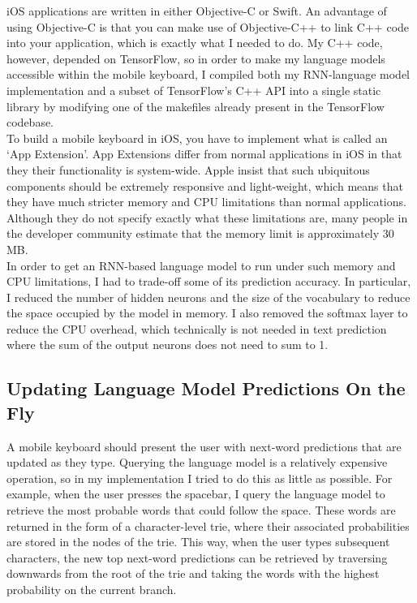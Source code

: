 \documentclass[a4paper, 12pt]{report}
\begin{document}
iOS applications are written in either Objective-C or Swift. An advantage of using Objective-C is that you can make use of Objective-C++ to link C++ code into your application, which is exactly what I needed to do. My C++ code, however, depended on TensorFlow, so in order to make my language models accessible within the mobile keyboard, I compiled both my RNN-language model implementation and a subset of TensorFlow's C++ API into a single static library by modifying one of the makefiles already present in the TensorFlow codebase. \\

To build a mobile keyboard in iOS, you have to implement what is called an `App Extension'. App Extensions differ from normal applications in iOS in that they their functionality is system-wide. Apple insist that such ubiquitous components should be extremely responsive and light-weight, which means that they have much stricter memory and CPU limitations than normal applications. Although they do not specify exactly what these limitations are, many people in the developer community estimate that the memory limit is approximately 30 MB. \\

In order to get an RNN-based language model to run under such memory and CPU limitations, I had to trade-off some of its prediction accuracy. In particular, I reduced the number of hidden neurons and the size of the vocabulary to reduce the space occupied by the model in memory. I also removed the softmax layer to reduce the CPU overhead, which technically is not needed in text prediction where the sum of the output neurons does not need to sum to 1.

\subsection{Updating Language Model Predictions On the Fly}

A mobile keyboard should present the user with next-word predictions that are updated as they type. Querying the language model is a relatively expensive operation, so in my implementation I tried to do this as little as possible. For example, when the user presses the spacebar, I query the language model to retrieve the most probable words that could follow the space. These words are returned in the form of a character-level trie, where their associated probabilities are stored in the nodes of the trie. This way, when the user types subsequent characters, the new top next-word predictions can be retrieved by traversing downwards from the root of the trie and taking the words with the highest probability on the current branch. \\
\end{document}
